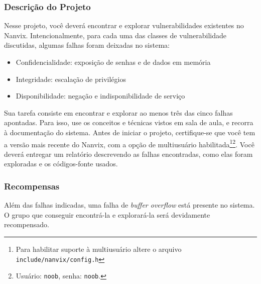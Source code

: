 \documentclass[11pt]{article}
\begin{document}
\subsubsection*{Descrição do Projeto}

Nesse projeto, você deverá encontrar e explorar vulnerabilidades existentes no Nanvix. Intencionalmente, para cada uma das classes de vulnerabilidade discutidas, algumas falhas foram deixadas no sistema:

\begin{itemize}
	\item Confidencialidade: exposição de senhas e de dados em memória
	\item Integridade: escalação de privilégios 
	\item Disponibilidade: negação e indisponibilidade de serviço
\end{itemize}

Sua tarefa consiste em encontrar e explorar ao menos três das cinco falhas apontadas. Para isso, use os conceitos e técnicas vistos em sala de aula, e recorra à documentação do sistema. Antes de iniciar o projeto, certifique-se que você tem a versão mais recente do Nanvix, com a opção de multiusuário habilitada\footnote{Para habilitar suporte à multiusuário altere o arquivo \texttt{include/nanvix/config.h}}\footnote{Usuário: \texttt{noob}, senha: \texttt{noob}.}. Você deverá entregar um relatório descrevendo as falhas encontradas, como elas foram exploradas e os códigos-fonte usados.

\subsubsection*{Recompensas}

Além das falhas indicadas, uma falha de \textit{buffer overflow} está presente no sistema. O grupo que conseguir encontrá-la e explorará-la será devidamente recompensado.
\end{document}
